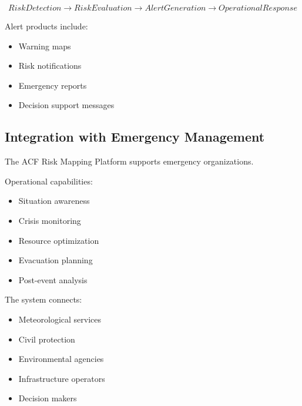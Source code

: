 \[
RiskDetection
\rightarrow
RiskEvaluation
\rightarrow
AlertGeneration
\rightarrow
OperationalResponse
\]


Alert products include:

\begin{itemize}

\item Warning maps

\item Risk notifications

\item Emergency reports

\item Decision support messages

\end{itemize}



\subsection{Integration with Emergency Management}

The ACF Risk Mapping Platform supports emergency organizations.

Operational capabilities:

\begin{itemize}

\item Situation awareness

\item Crisis monitoring

\item Resource optimization

\item Evacuation planning

\item Post-event analysis

\end{itemize}


The system connects:

\begin{itemize}

\item Meteorological services

\item Civil protection

\item Environmental agencies

\item Infrastructure operators

\item Decision makers

\end{itemize}


